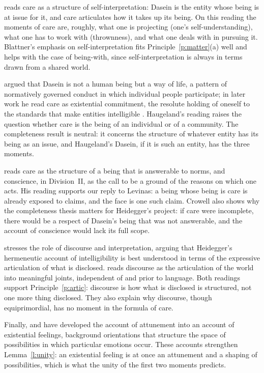 \documentclass{situationist-preprint}
\begin{document}
\citet{Blattner2006} reads care as a structure of self-interpretation: Dasein is the entity whose being is at issue for it, and care articulates how it takes up its being. On this reading the moments of care are, roughly, what one is projecting (one's self-understanding), what one has to work with (thrownness), and what one deals with in pursuing it. Blattner's emphasis on self-interpretation fits Principle~\ref{p:matter}(a) well and helps with the case of being-with, since self-interpretation is always in terms drawn from a shared world.

\citet{Haugeland1982} argued that Dasein is not a human being but a way of life, a pattern of normatively governed conduct in which individual people participate; in later work he read care as existential commitment, the resolute holding of oneself to the standards that make entities intelligible \citep{Haugeland2013}. Haugeland's reading raises the question whether care is the being of an individual or of a community. The completeness result is neutral: it concerns the structure of whatever entity has its being as an issue, and Haugeland's Dasein, if it is such an entity, has the three moments.

\citet{Crowell2013} reads care as the structure of a being that is answerable to norms, and conscience, in Division~II, as the call to be a ground of the reasons on which one acts. His reading supports our reply to Levinas: a being whose being is care is already exposed to claims, and the face is one such claim. Crowell also shows why the completeness thesis matters for Heidegger's project: if care were incomplete, there would be a respect of Dasein's being that was not answerable, and the account of conscience would lack its full scope.

\citet{Carman2003} stresses the role of discourse and interpretation, arguing that Heidegger's hermeneutic account of intelligibility is best understood in terms of the expressive articulation of what is disclosed. \citet{Wrathall2010} reads discourse as the articulation of the world into meaningful joints, independent of and prior to language. Both readings support Principle~\ref{p:artic}: discourse is how what is disclosed is structured, not one more thing disclosed. They also explain why discourse, though equiprimordial, has no moment in the formula of care.

Finally, \citet{Ratcliffe2008} and \citet{ElpidorouFreeman2015} have developed the account of attunement into an account of existential feelings, background orientations that structure the space of possibilities in which particular emotions occur. These accounts strengthen Lemma~\ref{l:unity}: an existential feeling is at once an attunement and a shaping of possibilities, which is what the unity of the first two moments predicts.
\end{document}
